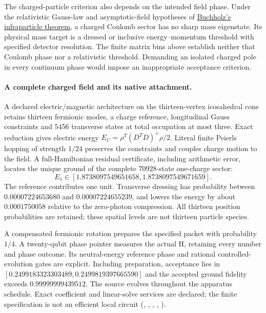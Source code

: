 The charged-particle criterion also depends on the intended field phase.
Under the relativistic Gauss-law and asymptotic-field hypotheses of
\href{https://doi.org/10.1016/0370-2693(86)91110-X}{Buchholz's infraparticle theorem},
a charged Coulomb sector has no sharp mass eigenstate. Its physical
mass target is a dressed or inclusive energy--momentum threshold with
specified detector resolution. The finite matrix bins above establish
neither that Coulomb phase nor a relativistic threshold. Demanding an
isolated charged pole in every continuum phase would impose an
inappropriate acceptance criterion.

\paragraph{A complete charged field and its native attachment.}
A declared electric/magnetic architecture on the thirteen-vertex
icosahedral cone retains thirteen fermionic modes, a charge reference,
longitudinal Gauss constraints and $5456$ transverse states at total
occupation at most three. Exact reduction gives electric energy
$E_C=\rho^T(D^TD)^+\rho/2$. Literal finite Peierls hopping of strength
$1/24$ preserves the constraints and couples charge motion to the field.
A full-Hamiltonian residual certificate, including arithmetic error,
locates the unique ground of the complete $70928$-state one-charge sector:
\[
 E_1\in[1.8738097549651658,1.8738097549671659].
\]
The reference contributes one unit. Transverse dressing has probability
between $0.00007224653680$ and $0.00007224655239$, and lowers the energy
by about $0.0001750058$ relative to the zero-photon compression.
All thirteen position probabilities are retained; these spatial levels
are not thirteen particle species.

A compensated fermionic rotation prepares the specified packet with
probability $1/4$. A twenty-qubit phase pointer measures the actual H,
retaining every number and phase outcome. Its neutral-energy reference
phase and rational controlled-evolution gates are explicit. Including
preparation, acceptance lies in
$[0.2499183323303489,0.2499819397665590]$ and the accepted ground fidelity
exceeds $0.99999999439512$. The source evolves throughout the apparatus
schedule. Exact coefficient and linear-solve services are declared;
the finite specification is not an efficient local circuit
(, ,
,
, \cite{ophrepo}).

